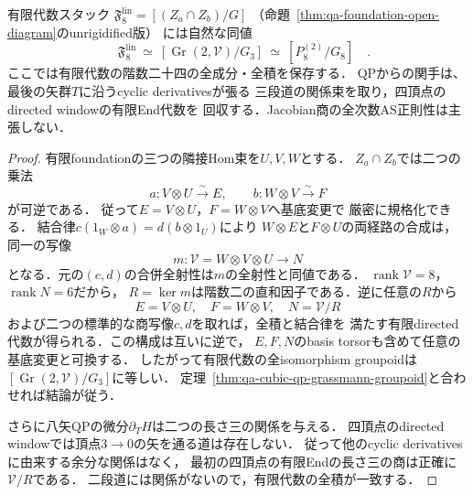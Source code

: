 \begin{proposition}
\label{prop:qa-cubic-qp-finite-foundation-groupoid}
有限代数スタック
\(\mathfrak F_8^{\mathrm{lin}}=[(Z_a\cap Z_b)/G]\)
（命題~\ref{thm:qa-foundation-open-diagram}のunrigidified版）
には自然な同値
\[
 \boxed{\quad
 \mathfrak F_8^{\mathrm{lin}}
 \ \simeq\
 [\operatorname{Gr}(2,\mathcal V)/G_3]
 \ \simeq\ [P_8^{(2)}/G_8]\quad}.
 \tag{FG}\label{eq:qa-cubic-qp-finite-groupoid}
\]
ここでは有限代数の階数二十四の全成分・全積を保存する．
QPからの関手は、最後の矢群$T$に沿うcyclic derivativesが張る
三段道の関係束を取り，四頂点のdirected windowの有限End代数を
回収する．Jacobian商の全次数AS正則性は主張しない．
\end{proposition}
\begin{proof}
有限foundationの三つの隣接Hom束を$U,V,W$とする．
$Z_a\cap Z_b$では二つの乗法
\[
 a:V\otimes U\xrightarrow{\sim}E,\qquad
 b:W\otimes V\xrightarrow{\sim}F
\]
が可逆である．
従って$E=V\otimes U$，$F=W\otimes V$へ基底変更で
厳密に規格化できる．
結合律$c(1_W\otimes a)=d(b\otimes1_U)$により
$W\otimes E$と$F\otimes U$の両経路の合成は，同一の写像
\[
 m:\mathcal V=W\otimes V\otimes U\longrightarrow N
\]
となる．元の$(c,d)$の合併全射性は$m$の全射性と同値である．
$\operatorname{rank}\mathcal V=8$，$\operatorname{rank}N=6$だから，
$R=\ker m$は階数二の直和因子である．逆に任意の$R$から
\[
 E=V\otimes U,\quad F=W\otimes V,\quad
 N=\mathcal V/R
\]
および二つの標準的な商写像$c,d$を取れば，全積と結合律を
満たす有限directed代数が得られる．この構成は互いに逆で，
$E,F,N$のbasis torsorも含めて任意の基底変更と可換する．
したがって有限代数の全isomorphism groupoidは
$[\operatorname{Gr}(2,\mathcal V)/G_3]$に等しい．
定理~\ref{thm:qa-cubic-qp-grassmann-groupoid}と合わせれば結論が従う．

さらに八矢QPの微分$\partial_T H$は二つの長さ三の関係を与える．
四頂点のdirected windowでは頂点$3\to0$の矢を通る道は存在しない．
従って他のcyclic derivativesに由来する余分な関係はなく，
最初の四頂点の有限Endの長さ三の商は正確に$\mathcal V/R$である．
二段道には関係がないので，有限代数の全積が一致する．
\end{proof}


